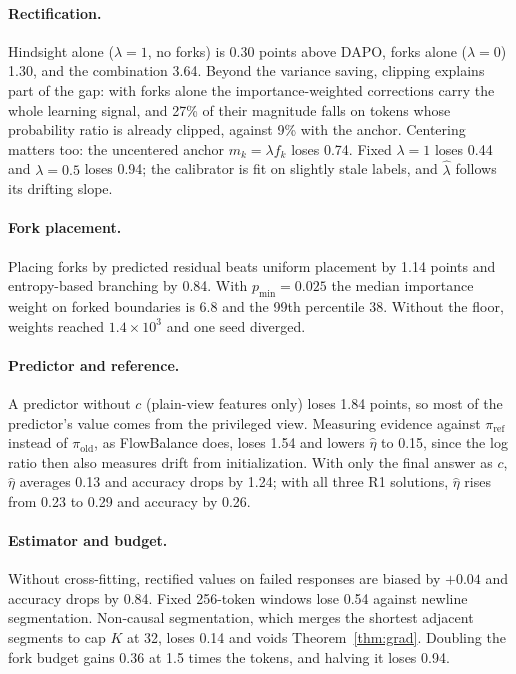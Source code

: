 \documentclass[11pt]{article}
\newcommand{\piold}{\pi_{\mathrm{old}}}
\theoremstyle{remark}
\begin{document}
\paragraph{Rectification.}
Hindsight alone ($\lambda=1$, no forks) is 0.30 points above DAPO, forks alone ($\lambda=0$) 1.30, and the combination 3.64. Beyond the variance saving, clipping explains part of the gap: with forks alone the importance-weighted corrections carry the whole learning signal, and 27\% of their magnitude falls on tokens whose probability ratio is already clipped, against 9\% with the anchor. Centering matters too: the uncentered anchor $m_k=\lambda f_k$ loses 0.74. Fixed $\lambda=1$ loses 0.44 and $\lambda=0.5$ loses 0.94; the calibrator is fit on slightly stale labels, and $\hat\lambda$ follows its drifting slope.

\paragraph{Fork placement.}
Placing forks by predicted residual beats uniform placement by 1.14 points and entropy-based branching by 0.84. With $p_{\min}=0.025$ the median importance weight on forked boundaries is 6.8 and the 99th percentile 38. Without the floor, weights reached $1.4\times10^3$ and one seed diverged.

\paragraph{Predictor and reference.}
A predictor without $c$ (plain-view features only) loses 1.84 points, so most of the predictor's value comes from the privileged view. Measuring evidence against $\pi_{\mathrm{ref}}$ instead of $\piold$, as FlowBalance does, loses 1.54 and lowers $\hat\eta$ to 0.15, since the log ratio then also measures drift from initialization. With only the final answer as $c$, $\hat\eta$ averages 0.13 and accuracy drops by 1.24; with all three R1 solutions, $\hat\eta$ rises from 0.23 to 0.29 and accuracy by 0.26.

\paragraph{Estimator and budget.}
Without cross-fitting, rectified values on failed responses are biased by $+0.04$ and accuracy drops by 0.84. Fixed 256-token windows lose 0.54 against newline segmentation. Non-causal segmentation, which merges the shortest adjacent segments to cap $K$ at 32, loses 0.14 and voids Theorem~\ref{thm:grad}. Doubling the fork budget gains 0.36 at 1.5 times the tokens, and halving it loses 0.94.
\end{document}

